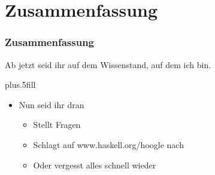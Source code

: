 \section*{Zusammenfassung}

\begin{frame}
\frametitle{Zusammenfassung}
\begin{block}{\vspace*{-3ex}}
Ab jetzt seid ihr auf dem Wissenstand, auf dem ich bin.

\vskip0pt plus.5fill
\begin{itemize}
  \item Nun seid ihr dran
  \begin{itemize}
    \item Stellt Fragen
    \item Schlagt auf www.haskell.org/hoogle nach 
    \item Oder vergesst alles schnell wieder
  \end{itemize}
\end{itemize}
\end{block}
\end{frame}
